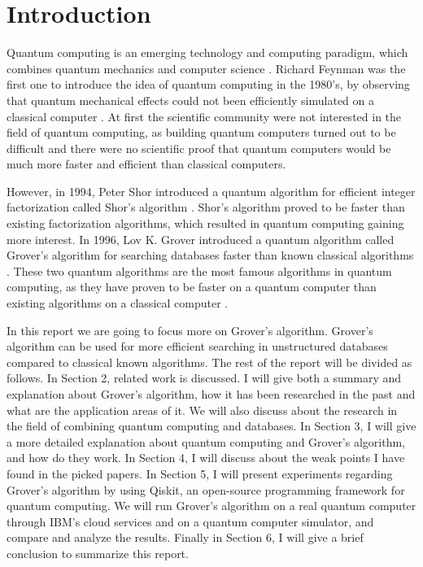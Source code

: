 \documentclass[english,oneside,openright]{UH_DS_report}
\begin{document}
\chapter{Introduction}
\label{chapter:intro}

Quantum computing is an emerging technology and computing paradigm, which combines quantum mechanics and computer science \cite{ambainis2004quantum, qcdb}. Richard Feynman was the first one to introduce the idea of quantum computing in the 1980's, by observing that quantum mechanical effects could not been efficiently simulated on a classical computer \cite{introtoqc}. At first the scientific community were not interested in the field of quantum computing, as building quantum computers turned out to be difficult and there were no scientific proof that quantum computers would be much more faster and efficient than classical computers. 

However, in 1994, Peter Shor introduced a quantum algorithm for efficient integer factorization called Shor's algorithm \cite{introtoqc}. Shor's algorithm proved to be faster than existing factorization algorithms, which resulted in quantum computing gaining more interest. In 1996, Lov K. Grover introduced a quantum algorithm called Grover's algorithm for searching databases faster than known classical algorithms \cite{grover1996fast}. These two quantum algorithms are the most famous algorithms in quantum computing, as they have proven to be faster on a quantum computer than existing algorithms on a classical computer \cite{ambainis2004quantum}.

In this report we are going to focus more on Grover's algorithm. Grover's algorithm can be used for more efficient searching in unstructured databases compared to classical known algorithms. The rest of the report will be divided as follows. In Section 2, related work is discussed. I will give both a summary and explanation about Grover's algorithm, how it has been researched in the past and what are the application areas of it. We will also discuss about the research in the field of combining quantum computing and databases. In Section 3, I will give a more detailed explanation about quantum computing and Grover's algorithm, and how do they work. In Section 4, I will discuss about the weak points I have found in the picked papers. In Section 5, I will present experiments regarding Grover's algorithm by using Qiskit, an open-source programming framework for quantum computing. We will run Grover's algorithm on a real quantum computer through IBM's cloud services and on a quantum computer simulator, and compare and analyze the results. Finally in Section 6, I will give a brief conclusion to summarize this report.
\end{document}
